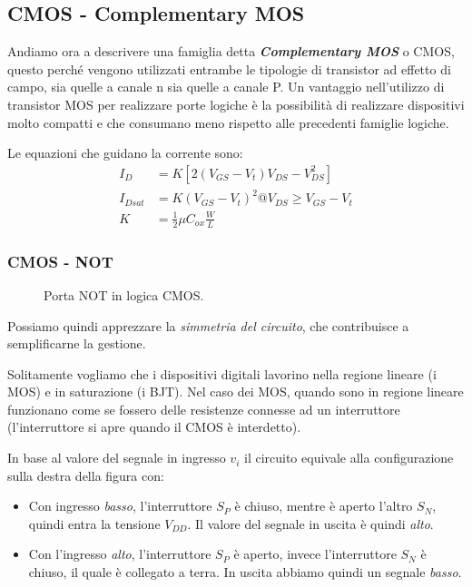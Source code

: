 \documentclass[
]{book}
\providecommand{\tightlist}{%
  \setlength{\itemsep}{0pt}\setlength{\parskip}{0pt}}
\begin{document}
\subsection{CMOS - Complementary MOS}\label{cmos---complementary-mos}

Andiamo ora a descrivere una famiglia detta \textbf{\emph{Complementary
MOS}} o CMOS, questo perché vengono utilizzati entrambe le tipologie di
transistor ad effetto di campo, sia quelle a canale n sia quelle a
canale P. Un vantaggio nell'utilizzo di transistor MOS per realizzare
porte logiche è la possibilità di realizzare dispositivi molto compatti
e che consumano meno rispetto alle precedenti famiglie logiche.

Le equazioni che guidano la corrente sono: \begin{align*}
 I_D&=K[2(V_{GS}-V_t)V_{DS}-V_{DS}^2] \\
 I_{Dsat}&=K(V_{GS}-V_t)^2@V_{DS}\geq V_{GS}-V_t \\
 K&=\frac{1}{2}\mu C_{ox}\frac{W}{L}
\end{align*}

\subsubsection{CMOS - NOT}\label{cmos---not}

\begin{figure}[H]
    \centering
    \resizebox{0.5\textwidth}{!}{}
    \caption{Porta NOT in logica CMOS.}
\end{figure}

Possiamo quindi apprezzare la \emph{simmetria del circuito}, che
contribuisce a semplificarne la gestione.

Solitamente vogliamo che i dispositivi digitali lavorino nella regione
lineare (i MOS) e in saturazione (i BJT). Nel caso dei MOS, quando sono
in regione lineare funzionano come se fossero delle resistenze connesse
ad un interruttore (l'interruttore si apre quando il CMOS è interdetto).

In base al valore del segnale in ingresso \(v_{i}\) il circuito equivale
alla configurazione sulla destra della figura con:

\begin{itemize}
\tightlist
\item
  Con ingresso \emph{basso}, l'interruttore \(S_P\) è chiuso, mentre è
  aperto l'altro \(S_N\), quindi entra la tensione \(V_{DD}\). Il valore
  del segnale in uscita è quindi \emph{alto}.
\item
  Con l'ingresso \emph{alto}, l'interruttore \(S_P\) è aperto, invece
  l'interruttore \(S_N\) è chiuso, il quale è collegato a terra. In
  uscita abbiamo quindi un segnale \emph{basso}.
\end{itemize}
\end{document}
